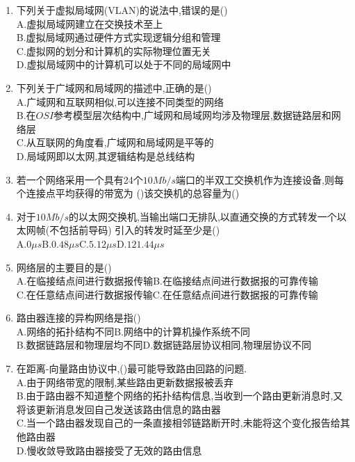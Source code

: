 \documentclass[12pt, a4paper, oneside, UTF8]{ctexbook}
\begin{document}
\begin{enumerate}
    \item 下列关于虚拟局域网(VLAN)的说法中,错误的是() \\
    A.虚拟局域网建立在交换技术至上 \\
    B.虚拟局域网通过硬件方式实现逻辑分组和管理\\
    C.虚拟网的划分和计算机的实际物理位置无关 \\
    D.虚拟局域网中的计算机可以处于不同的局域网中
    
    \item 下列关于广域网和局域网的描述中,正确的是() \\
    A.广域网和互联网相似,可以连接不同类型的网络 \\
    B.在$OSI$参考模型层次结构中,广域网和局域网均涉及物理层,数据链路层和网络层 \\
    C.从互联网的角度看,广域网和局域网是平等的 \\
    D.局域网即以太网,其逻辑结构是总线结构 

    \item 若一个网络采用一个具有24个$10Mb/s$端口的半双工交换机作为连接设备,则每个连接点平均获得的带宽为
    ()该交换机的总容量为()

    \item \bt 对于$10Mb/s$的以太网交换机,当输出端口无排队,以直通交换的方式转发一个以太网帧(不包括前导码)
    引入的转发时延至少是() \\
    A.$0\mu s$\qquad B.$0.48\mu s$\qquad C.$5.12\mu s$\qquad D.$121.44\mu s$ 


    \item 网络层的主要目的是() \\
    A.在临接结点间进行数据报传输\qquad B.在临接结点间进行数据报的可靠传输 \\
    C.在任意结点间进行数据报传输\qquad C.在任意结点间进行数据报的可靠传输

    \item 路由器连接的异构网络是指() \\
    A.网络的拓扑结构不同\qquad B.网络中的计算机操作系统不同\\
    B.数据链路层和物理层均不同\qquad D.数据链路层协议相同,物理层协议不同 

    \item 在距离-向量路由协议中,()最可能导致路由回路的问题. \\
    A.由于网络带宽的限制,某些路由更新数据报被丢弃 \\
    B.由于路由器不知道整个网络的拓扑结构信息,当收到一个路由更新消息时,又将该更新消息发回自己发送该路由信息的路由器 \\
    C.当一个路由器发现自己的一条直接相邻链路断开时,未能将这个变化报告给其他路由器\\
    D.慢收敛导致路由器接受了无效的路由信息


\end{enumerate}
\end{document}
